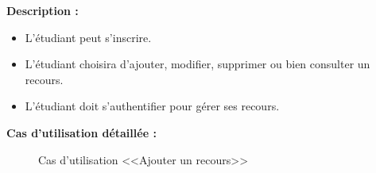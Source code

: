 \documentclass[12pt]{report}
\begin{document}
\vspace{-0.15in}

\textbf{Description :}

\begin{itemize}
    \item L'étudiant peut s'inscrire.
    \item L'étudiant choisira d'ajouter, modifier, supprimer ou bien consulter un recours.
    \item L'étudiant doit s'authentifier pour gérer ses recours.
\end{itemize}

\newpage

\textbf{Cas d'utilisation détaillée :}

\begin{figure}[h]
\centering
    \centerline{}
    \caption{Cas d'utilisation <<Ajouter un recours>>}
\end{figure}

\end{document}
